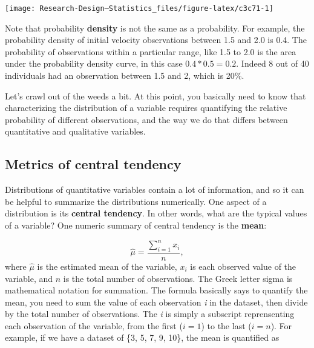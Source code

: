 \documentclass[
]{book}
\newenvironment{Shaded}{\begin{snugshade}}{\end{snugshade}}
\newcommand{\AttributeTok}[1]{\textcolor[rgb]{0.13,0.29,0.53}{#1}}
\newcommand{\ConstantTok}[1]{\textcolor[rgb]{0.56,0.35,0.01}{#1}}
\newcommand{\FunctionTok}[1]{\textcolor[rgb]{0.13,0.29,0.53}{\textbf{#1}}}
\newcommand{\NormalTok}[1]{#1}
\newcommand{\SpecialCharTok}[1]{\textcolor[rgb]{0.81,0.36,0.00}{\textbf{#1}}}
\newcommand{\StringTok}[1]{\textcolor[rgb]{0.31,0.60,0.02}{#1}}
\begin{document}
\begin{Shaded}
\end{Shaded}

\begin{center}\texttt{[image: Research-Design---Statistics\_files/figure-latex/c3c71-1]} \end{center}

Note that probability \textbf{density} is not the same as a probability. For example, the probability density of initial velocity observations between 1.5 and 2.0 is 0.4. The probability of observations within a particular range, like 1.5 to 2.0 is the area under the probability density curve, in this case \(0.4*0.5 = 0.2\). Indeed 8 out of 40 individuals had an observation between 1.5 and 2, which is 20\%.

Let's crawl out of the weeds a bit. At this point, you basically need to know that characterizing the distribution of a variable requires quantifying the relative probability of different observations, and the way we do that differs between quantitative and qualitative variables.

\subsection{Metrics of central tendency}\label{metrics-of-central-tendency}

Distributions of quantitative variables contain a lot of information, and so it can be helpful to summarize the distributions numerically. One aspect of a distribution is its \textbf{central tendency}. In other words, what are the typical values of a variable? One numeric summary of central tendency is the \textbf{mean}:

\[
\hat{\mu} = \frac{\sum_{i=1}^n x_i}{n},
\]
where \(\hat{\mu}\) is the estimated mean of the variable, \(x_i\) is each observed value of the variable, and \(n\) is the total number of observations. The Greek letter sigma is mathematical notation for summation. The formula basically says to quantify the mean, you need to sum the value of each observation \emph{i} in the dataset, then divide by the total number of observations. The \emph{i} is simply a subscript reprensenting each observation of the variable, from the first (\(i = 1\)) to the last (\(i = n\)). For example, if we have a dataset of \{3, 5, 7, 9, 10\}, the mean is quantified as
\end{document}
